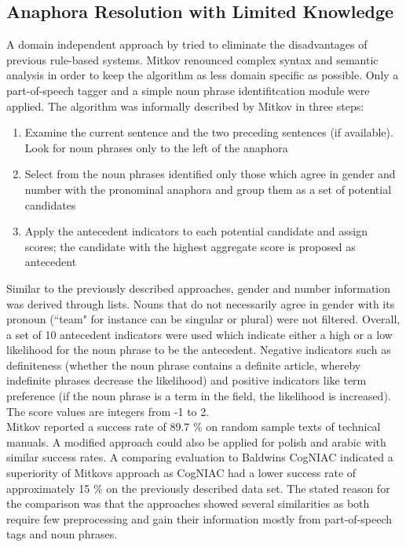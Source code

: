 \subsection{Anaphora Resolution with Limited Knowledge}
\label{anaphoraLimitedKnowledgeSection}
A domain independent approach by \cite{mitkov1998robust} tried to eliminate the disadvantages of previous rule-based systems. Mitkov renounced complex syntax and semantic analysis in order to keep the algorithm as less domain specific as possible. Only a part-of-speech tagger and a simple noun phrase identifitcation module were applied. The algorithm was informally described by Mitkov in three steps:
\begin{enumerate} 
\item Examine the current sentence and the two preceding sentences (if available). Look for noun phrases only to the left of the anaphora
\item Select from the noun phrases identified only those which agree in gender and number with the pronominal anaphora and group them as a set of potential candidates
\item Apply the antecedent indicators to each potential candidate and assign scores; the candidate with the highest aggregate score is proposed as antecedent
\end{enumerate}
Similar to the previously described approaches, gender and number information was derived through lists. Nouns that do not necessarily agree in gender with its pronoun (``team" for instance can be singular or plural) were not filtered.
Overall, a set of 10 antecedent indicators were used which indicate either a high or a low likelihood for the noun phrase to be the antecedent. Negative indicators such as definiteness (whether the noun phrase contains a definite article, whereby indefinite phrases decrease the likelihood) and positive indicators like term preference (if the noun phrase is a term in the field, the likelihood is increased). The score values are integers from -1 to 2. \\
Mitkov reported a success rate of 89.7 \% on random sample texts of technical manuals. A modified approach could also be applied for polish \citep{mitkov2000robust} and arabic \citep{mitkov1998multilingual} with similar success rates.
A comparing evaluation to Baldwins CogNIAC \citep{baldwin1997cogniac} indicated a superiority of Mitkovs approach \citep{mitkov1998robust} as CogNIAC had a lower success rate of approximately 15 \% on the previously described data set. The stated reason for the comparison was that the approaches showed several similarities as both require few preprocessing and gain their information mostly from part-of-speech tags and noun phrases.\\
